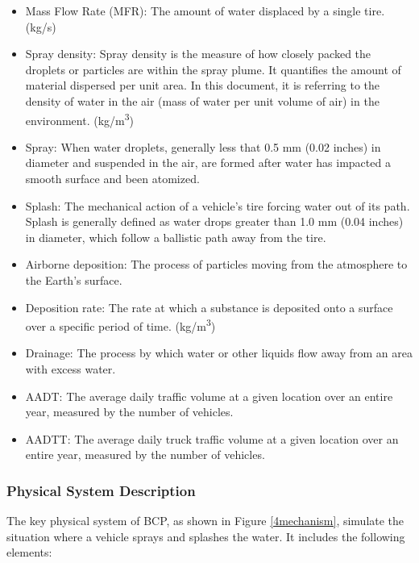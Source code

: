 \documentclass[12pt]{article}
\begin{document}
\begin{itemize}
\item Mass Flow Rate (MFR): The amount of water displaced by a single tire. (kg/s)
\item Spray density: Spray density is the measure of how closely packed the droplets or particles are within the spray plume. It quantifies the amount of material dispersed per unit area. In this document, it is referring to the density of water in the air (mass of water per unit volume of air) in the environment. (\si{kg/m^3})
\item Spray: When water droplets, generally less that 0.5 mm (0.02 inches) in diameter and suspended in the air, are formed after water has impacted a smooth surface and been atomized.
\item Splash: The mechanical action of a vehicle’s tire forcing water out of its path. Splash is generally defined as water drops greater than 1.0 mm (0.04 inches) in diameter, which follow a ballistic path away from the tire.
\item Airborne deposition: The process of particles moving from the atmosphere to the Earth's surface.
\item Deposition rate: The rate at which a substance is deposited onto a surface over a specific period of time. (\si{kg/m^3})
\item Drainage: The process by which water or other liquids flow away from an area with excess water.
\item AADT: The average daily traffic volume at a given location over an entire year, measured by the number of vehicles.
\item AADTT:  The average daily truck traffic volume at a given location over an entire year, measured by the number of vehicles.

\end{itemize}

\subsubsection{Physical System Description} \label{sec_phySystDescrip}


The key physical system of BCP, as shown in Figure \ref{4mechanism}, simulate the situation where a vehicle sprays and splashes the water. It includes the following elements:
\end{document}
